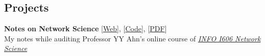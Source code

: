 \documentclass[margin,line, 10pt]{res}
\begin{document}
\begin{resume}





\section{\sc Projects}
{\bf Notes on Network Science}{\hspace{2em} [\href{https://netsci.hongtaoh.com/}{Web}], [\href{https://github.com/hongtaoh/netsci-notes}{Code}], 
[\href{https://netsci.hongtaoh.com/netsci.pdf}{PDF}]} \\
My notes while auditing Professor YY Ahn's online course of \href{https://github.com/yy/netsci-course}{\emph{INFO I606 Network Science} }


\end{resume}
\end{document}
